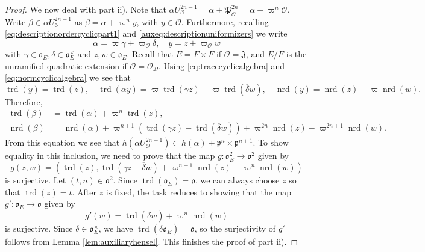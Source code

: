 \documentclass[10pt,a4paper]{amsart}
\DeclareMathOperator{\nrd}{nrd}
\DeclareMathOperator{\trd}{trd}
\newcommand{\D}{\mathcal{D}}
\newcommand{\J}{\mathfrak{J}}
\newcommand{\p}{\mathfrak{p}}
\renewcommand{\O}{\mathcal{O}}
\renewcommand{\P}{\mathfrak{P}}
\renewcommand{\o}{\mathfrak{o}}
\begin{document}
\begin{proof}
We now deal with part ii). Note that $\alpha U_\O^{2n-1} = \alpha + \P_\O^{2n} = \alpha + \varpi^n \O$. Write $\beta \in \alpha U_\O^{2n-1}$ as $\beta = \alpha + \varpi^n y$, with $y \in \O$. Furthermore, recalling \eqref{eq:descriptionordercyclicpart1} and \eqref{auxeq:descriptionuniformizers} we write
\begin{equation}\label{auxeq:decompositionelements}
    \alpha = \varpi \gamma + \varpi_\O \delta, \quad y = z + \varpi_\O w
\end{equation}
with $\gamma \in \o_E, \delta \in \o_E^\times$ and $z, w \in \o_E$. Recall that $E = F\times F$ if $\O = \J$, and $E/F$ is the unramified quadratic extension if $\O = \O_\D$. Using \eqref{eq:tracecyclicalgebra} and \eqref{eq:normcyclicalgebra} we see that 
\begin{equation*}
    \trd(y) = \trd(z), \quad \trd(\overline{\alpha}y) = \varpi \trd(\overline{\gamma}z) - \varpi \trd(\overline{\delta}w),\quad \nrd(y) = \nrd(z)-\varpi \nrd(w).
\end{equation*}
Therefore, 
\begin{equation*}
\begin{aligned}
\trd(\beta) & = \trd(\alpha) + \varpi^n \trd(z),\\
\nrd(\beta) & = \nrd(\alpha) + \varpi^{n + 1} (\trd(\overline{\gamma}z)- \trd(\overline{\delta}w)) + \varpi^{2n}\nrd(z) - \varpi^{2n + 1}\nrd(w).
\end{aligned}
\end{equation*}
From this equation we see that $h(\alpha U_\O^{2n-1})\subset h(\alpha) + \p^n \times \p^{n + 1}$. To show equality in this inclusion, we need to prove that the map $g: \o_E^2 \rightarrow \o^2$ given by
\begin{equation*}
    g(z, w) = (\trd(z), \trd(\overline{\gamma}z - \overline{\delta}w) + \varpi^{n-1}\nrd(z) - \varpi^{n}\nrd(w))
\end{equation*}
is surjective. Let $(t, n) \in \o^2$. Since $\trd(\o_E) = \o$, we can always choose $z$ so that $\trd(z) = t$. After $z$ is fixed, the task reduces to showing that the map $g': \o_E \rightarrow \o$ given by
\begin{equation*}
    g'(w) = \trd(\overline{\delta}w) + \varpi^n \nrd(w)
\end{equation*}
is surjective. Since $\delta \in \o_E^\times$, we have $\trd(\overline{\delta}\o_E) = \o$, so the surjectivity of $g'$ follows from Lemma \ref{lem:auxiliaryhensel}. This finishes the proof of part ii).


\end{proof}
\end{document}
